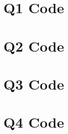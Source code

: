 \documentclass[a4paper, 12pt]{article}
\begin{document}
    \begin{appendices}
        \section{Q1 Code}
            
        \section{Q2 Code}
            
        \section{Q3 Code}
            
        \section{Q4 Code}
            
    \end{appendices}
\end{document}
